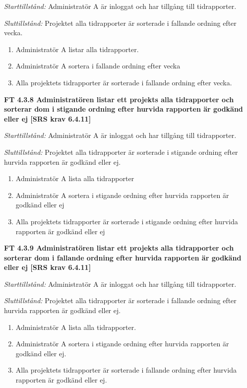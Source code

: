 \documentclass[a4paper]{article}
\begin{document}
\emph{Starttillstånd:} Administratör A är inloggat och har tillgång till tidrapporter.

\emph{Sluttillstånd:} Projektet alla tidrapporter är sorterade i fallande ordning efter vecka.

\begin{enumerate}
\item Administratör A listar alla tidrapporter.
\item Administratör A sortera i fallande ordning efter vecka
\item Alla projektets tidrapporter är sorterade i fallande ordning efter vecka.
\end{enumerate}

\textbf{FT 4.3.8 Administratören listar ett projekts alla tidrapporter och sorterar dom i stigande ordning efter hurvida rapporten är godkänd eller ej [SRS krav 6.4.11]}

\emph{Starttillstånd:} Administratör A är inloggat och har tillgång till tidrapporter.

\emph{Sluttillstånd:} Projektet alla tidrapporter är sorterade i stigande ordning efter hurvida rapporten är godkänd eller ej.

\begin{enumerate}
\item Administratör A lista alla tidrapporter
\item Administratör A sortera i stigande ordning efter hurvida rapporten är godkänd eller ej
\item Alla projektets tidrapporter är sorterade i stigande ordning efter hurvida rapporten är godkänd eller ej
\end{enumerate}

\textbf{FT 4.3.9 Administratören listar ett projekts alla tidrapporter och sorterar dom i fallande ordning efter hurvida rapporten är godkänd eller ej [SRS krav 6.4.11]}

\emph{Starttillstånd:} Administratör A är inloggat och har tillgång till tidrapporter.

\emph{Sluttillstånd:} Projektet alla tidrapporter är sorterade i fallande ordning efter hurvida rapporten är godkänd eller ej.

\begin{enumerate}
\item Administratör A lista alla tidrapporter.
\item Administratör A sortera i stigande ordning efter hurvida rapporten är godkänd eller ej.
\item Alla projektets tidrapporter är sorterade i fallande ordning efter hurvida rapporten är godkänd eller ej.
\end{enumerate}
\end{document}
